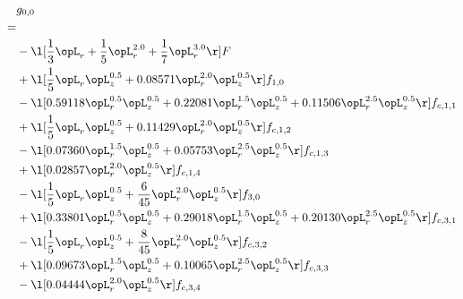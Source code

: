 \begin{alignat}{2} 
\label{eq:g_00_0} 
& g_{0,0} \nonumber \\ 
 = \\ 
& - \l[ \frac{1}{3} \opL_r + \frac{1}{5} \opL_r^{2.0} + \frac{1}{7} \opL_r^{3.0}  \r] F \nonumber \\ 
& + \l[ \frac{1}{5} \opL_r \opL_z^{0.5} +  0.08571 \opL_r^{2.0} \opL_z^{0.5}  \r] f_{1,0} \nonumber \\ 
& - \l[  0.59118 \opL_r^{0.5} \opL_z^{0.5} +  0.22081 \opL_r^{1.5} \opL_z^{0.5} +  0.11506 \opL_r^{2.5} \opL_z^{0.5}  \r] f_{c,1,1} \nonumber \\ 
& + \l[ \frac{1}{5} \opL_r \opL_z^{0.5} +  0.11429 \opL_r^{2.0} \opL_z^{0.5}  \r] f_{c,1,2} \nonumber \\ 
& - \l[  0.07360 \opL_r^{1.5} \opL_z^{0.5} +  0.05753 \opL_r^{2.5} \opL_z^{0.5}  \r] f_{c,1,3} \nonumber \\ 
& + \l[  0.02857 \opL_r^{2.0} \opL_z^{0.5}  \r] f_{c,1,4} \nonumber \\ 
& - \l[ \frac{1}{5} \opL_r \opL_z^{0.5} + \frac{6}{45} \opL_r^{2.0} \opL_z^{0.5}  \r] f_{3,0} \nonumber \\ 
& + \l[  0.33801 \opL_r^{0.5} \opL_z^{0.5} +  0.29018 \opL_r^{1.5} \opL_z^{0.5} +  0.20130 \opL_r^{2.5} \opL_z^{0.5}  \r] f_{c,3,1} \nonumber \\ 
& - \l[ \frac{1}{5} \opL_r \opL_z^{0.5} + \frac{8}{45} \opL_r^{2.0} \opL_z^{0.5}  \r] f_{c,3,2} \nonumber \\ 
& + \l[  0.09673 \opL_r^{1.5} \opL_z^{0.5} +  0.10065 \opL_r^{2.5} \opL_z^{0.5}  \r] f_{c,3,3} \nonumber \\ 
& - \l[  0.04444 \opL_r^{2.0} \opL_z^{0.5}  \r] f_{c,3,4} \nonumber \\ 
\end{alignat} 


